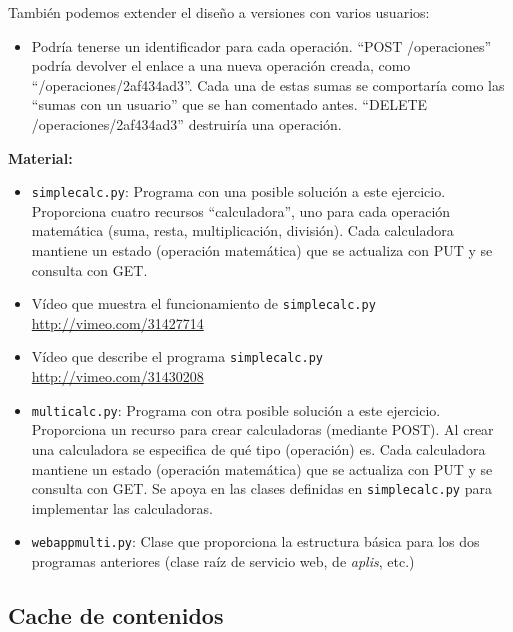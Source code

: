 También podemos extender el diseño a versiones con varios usuarios:

\begin{itemize}
\item Podría tenerse un identificador para cada operación. ``POST /operaciones'' podría devolver el enlace a una nueva operación creada, como ``/operaciones/2af434ad3''. Cada una de estas sumas se comportaría como las ``sumas con un usuario'' que se han comentado antes. ``DELETE  /operaciones/2af434ad3'' destruiría una operación.
\end{itemize}

\textbf{Material:}

\begin{itemize}
\item \texttt{simplecalc.py}: Programa con una posible solución a este ejercicio. Proporciona cuatro recursos ``calculadora'', uno para cada operación matemática (suma, resta, multiplicación, división). Cada calculadora mantiene un estado (operación matemática) que se actualiza con PUT y se consulta con GET.
\item Vídeo que muestra el funcionamiento de \texttt{simplecalc.py} \\
  \url{http://vimeo.com/31427714}
\item Vídeo que describe el programa \texttt{simplecalc.py} \\
  \url{http://vimeo.com/31430208}
\item \texttt{multicalc.py}: Programa con otra posible solución a este ejercicio. Proporciona un recurso para crear calculadoras (mediante POST). Al crear una calculadora se especifica de qué tipo (operación) es. Cada calculadora mantiene un estado (operación matemática) que se actualiza con PUT y se consulta con GET. Se apoya en las clases definidas en \texttt{simplecalc.py} para implementar las calculadoras.
\item \texttt{webappmulti.py}: Clase que proporciona la estructura básica para los dos programas anteriores (clase raíz de servicio web, de \emph{aplis}, etc.)
\end{itemize}


\subsection{Cache de contenidos}
\label{subsec:cache-contenidos}

